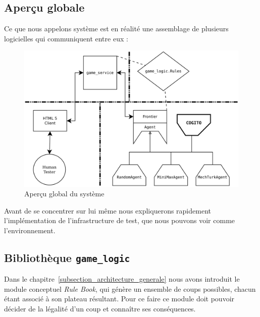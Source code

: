 \subsection{Aperçu globale}

Ce que nous appelons système est en réalité une assemblage de plusieurs logicielles qui communiquent entre eux :

\begin{figure}[H] 
\centering
\includegraphics[width=\textwidth]{files/william/archi_full} 
\caption{Aperçu global du système} 
\end{figure}

Avant de se concentrer sur \cogito{} lui même nous expliquerons rapidement l'implémentation de l'infrastructure de test, que nous pouvons voir comme l'environnement.

\subsection{Bibliothèque \texttt{\gls{game_logic}}}

Dans le chapitre~\ref{subsection_architecture_generale} nous avons introduit le module conceptuel \emph{Rule Book}, qui génère un ensemble de coups possibles, chacun étant associé à son plateau résultant. Pour ce faire ce module doit pouvoir décider de la légalité d'un coup et connaître ses conséquences. 

